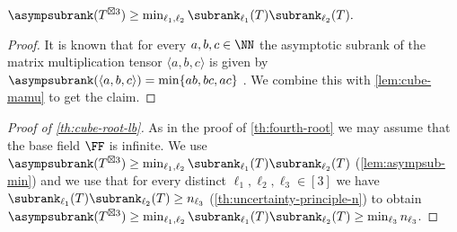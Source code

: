 \begin{lemma}\label{lem:asympsub-min}
    $\asympsubrank(T^{\boxtimes 3}) \geq \min_{{\ell_1},{\ell_2}} \subrank_{\ell_1}(T) \subrank_{\ell_2}(T).$
\end{lemma}
\begin{proof}
    It is known that for every $a,b,c \in \NN$ the asymptotic subrank of the matrix multiplication tensor $\langle a,b,c\rangle$ is given by $\asympsubrank(\langle a,b,c\rangle) = \min \{ab, bc, ac\}$ \cite[Equation~4.6]{strassen1988asymptotic}. We combine this with \autoref{lem:cube-mamu} to get the claim.
\end{proof}

\begin{proof}[Proof of \autoref{th:cube-root-lb}]
As in the proof of \autoref{th:fourth-root} we may assume that the base field $\FF$ is infinite.
%
%
%
We use $\asympsubrank(T^{\boxtimes 3}) \geq \min_{{\ell_1},{\ell_2}} \subrank_{\ell_1}(T) \subrank_{\ell_2}(T)$ (\autoref{lem:asympsub-min}) and we use that for every distinct ${\ell_1}, {\ell_2}, {\ell_3} \in [3]$ we have $\subrank_{\ell_1}(T)\subrank_{\ell_2}(T) \geq n_{\ell_3}$ (\autoref{th:uncertainty-principle-n}) to obtain
$\asympsubrank(T^{\boxtimes 3}) \geq \min_{{\ell_1},{\ell_2}} \subrank_{\ell_1}(T) \subrank_{\ell_2}(T) \geq \min_{\ell_3} n_{\ell_3}$. %
\end{proof}
